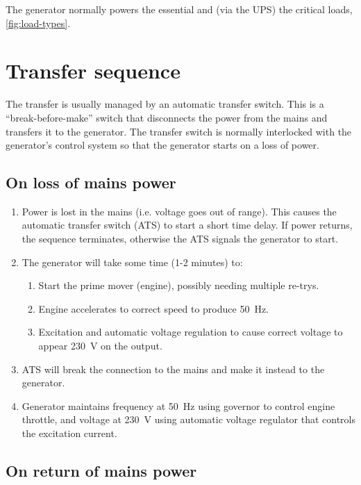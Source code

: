 \documentclass{pgnotes}
\begin{document}
The generator normally powers the essential and (via the UPS) the critical loads, \autoref{fig:load-types}.


\section{Transfer sequence}

The transfer is usually managed by an automatic transfer switch.
This is a ``break-before-make'' switch that disconnects the power from the mains and transfers it to the generator.
The transfer switch is normally interlocked with the generator's control system so that the generator starts on a loss of power.

\subsection{On loss of mains power}

\begin{enumerate}
\item Power is lost in the mains (i.e. voltage goes out of range). This causes the automatic transfer switch (ATS) to start a short time delay.  If power returns, the sequence terminates, otherwise the ATS signals the generator to start.
\item The generator will take some time (1-2 minutes) to:
  \begin{enumerate}
  \item Start the prime mover (engine), possibly needing multiple re-trys.
  \item Engine accelerates to correct speed to produce \SI{50}{\hertz}.
  \item Excitation and automatic voltage regulation to cause correct voltage to appear \SI{230}{\volt} on the output.
  \end{enumerate}
\item ATS will break the connection to the mains and make it instead to the generator.\label{item:ats-switch-to-generator}
\item Generator maintains frequency at \SI{50}{\hertz} using governor to control engine throttle, and voltage at \SI{230}{\volt} using automatic voltage regulator that controls the excitation current.
\end{enumerate}

\subsection{On return of mains power}
\end{document}
